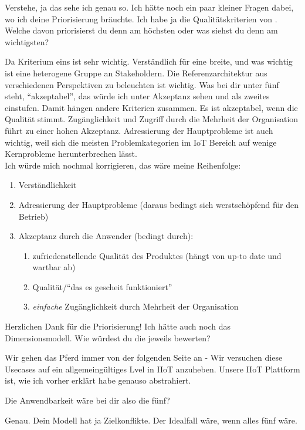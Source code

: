 \LF Verstehe, ja das sehe ich genau so. Ich hätte noch ein paar kleiner Fragen dabei, wo ich deine Priorisierung bräuchte. Ich habe ja die Qualitätskriterien von \citeauthor{Muller.2020}. Welche davon priorisierst du denn am höchsten oder was siehst du denn am wichtigsten?

\PE Da Kriterium eins ist sehr wichtig. Verständlich für eine breite, und was wichtig ist eine heterogene Gruppe an Stakeholdern. Die Referenzarchitektur aus verschiedenen Perspektiven zu beleuchten ist wichtig. Was bei dir unter fünf steht, \enquote{akzeptabel}, das würde ich unter Akzeptanz sehen und als zweites einstufen. Damit hängen andere Kriterien zusammen. Es ist akzeptabel, wenn die Qualität stimmt. Zugänglichkeit und Zugriff durch die Mehrheit der Organisation führt zu einer hohen Akzeptanz. Adressierung der Hauptprobleme ist auch wichtig, weil sich die meisten Problemkategorien im \ac{IoT} Bereich auf wenige Kernprobleme herunterbrechen lässt. \\
Ich würde mich nochmal korrigieren, das wäre meine Reihenfolge:
\begin{enumerate}
    \item Verständlichkeit
    \item Adressierung der Hauptprobleme (daraus bedingt sich werstschöpfend für den Betrieb)
    \item Akzeptanz durch die Anwender (bedingt durch):
    \begin{enumerate}
        \item zufriedenstellende Qualität des Produktes (hängt von up-to date und wartbar ab)
        \item Qualität/\enquote{das es gescheit funktioniert}
        \item \textit{einfache} Zugänglichkeit durch Mehrheit der Organisation
    \end{enumerate}
\end{enumerate}

\LF Herzlichen  Dank für die Priorisierung! Ich hätte auch noch das Dimensionsmodell. Wie würdest du die jeweils bewerten?

\PE Wir gehen das Pferd immer von der folgenden Seite an - Wir versuchen diese Usecases auf ein allgemeingültiges Lvel in \ac{IIoT} anzuheben. Unsere \ac{IIoT} Plattform ist, wie ich vorher erklärt habe genauso abstrahiert.

\LF Die Anwendbarkeit wäre bei dir also die fünf?

\PE Genau. Dein Modell hat ja Zielkonflikte. Der Idealfall wäre, wenn alles fünf wäre. 

